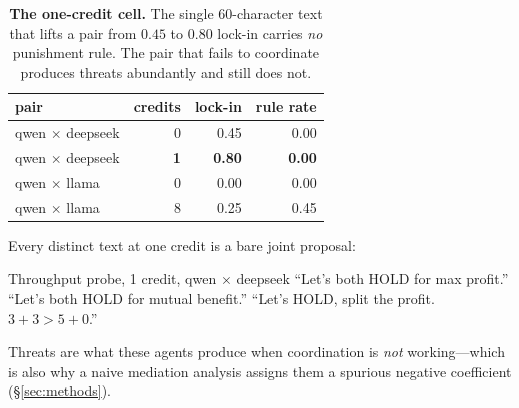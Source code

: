 \begin{table}[t]
\centering
\caption{\textbf{The one-credit cell.} The single $60$-character text that lifts a
pair from $0.45$ to $0.80$ lock-in carries \emph{no} punishment rule. The pair that
fails to coordinate produces threats abundantly and still does not.}
\label{tab:sms}
\small
\begin{tabular}{lrrr}
\toprule
pair & credits & lock-in & rule rate \\
\midrule
qwen $\times$ deepseek & 0 & 0.45 & 0.00 \\
qwen $\times$ deepseek & \textbf{1} & \textbf{0.80} & \textbf{0.00} \\
qwen $\times$ llama    & 0 & 0.00 & 0.00 \\
qwen $\times$ llama    & 8 & 0.25 & 0.45 \\
\bottomrule
\end{tabular}
\end{table}

Every distinct text at one credit is a bare joint proposal:

\begin{excerpt}{Throughput probe, 1 credit, qwen $\times$ deepseek}
``Let's both HOLD for max profit.'' \quad ``Let's both HOLD for mutual benefit.''
\quad ``Let's HOLD, split the profit. $3{+}3 > 5{+}0$.''
\end{excerpt}

\noindent Threats are what these agents produce when coordination is \emph{not}
working---which is also why a naive mediation analysis assigns them a spurious
negative coefficient (\S\ref{sec:methods}).

